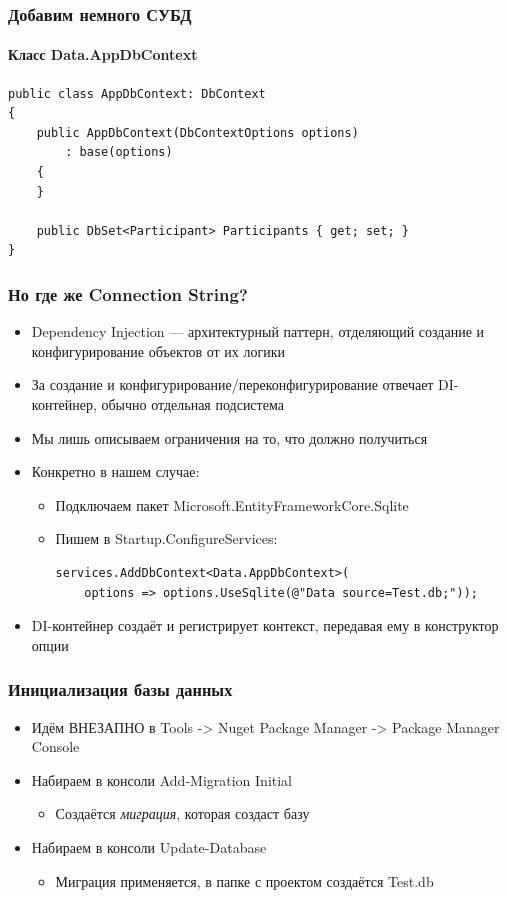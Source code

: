 \documentclass[xetex,mathserif,serif]{beamer}
\begin{document}
	\begin{frame}[fragile]
		\frametitle{Добавим немного СУБД}
		\framesubtitle{Класс Data.AppDbContext}
		\begin{small}
			\begin{verbatim}
public class AppDbContext: DbContext
{
    public AppDbContext(DbContextOptions options)
        : base(options)
    {
    }

    public DbSet<Participant> Participants { get; set; }
}
			\end{verbatim}
		\end{small}
	\end{frame}

	\begin{frame}[fragile]
		\frametitle{Но где же Connection String?}
		\begin{itemize}
			\item Dependency Injection --- архитектурный паттерн, отделяющий создание и конфигурирование объектов от их логики
			\item За создание и конфигурирование/переконфигурирование отвечает DI-контейнер, обычно отдельная подсистема
			\item Мы лишь описываем ограничения на то, что должно получиться
			\item Конкретно в нашем случае:
			\begin{itemize} 
				\item Подключаем пакет Microsoft.EntityFrameworkCore.Sqlite
				\item Пишем в Startup.ConfigureServices:
				\begin{verbatim}
services.AddDbContext<Data.AppDbContext>(
    options => options.UseSqlite(@"Data source=Test.db;"));
				\end{verbatim}
			\end{itemize}
			\item DI-контейнер создаёт и регистрирует контекст, передавая ему в конструктор опции
		\end{itemize}
	\end{frame}

	\begin{frame}
		\frametitle{Инициализация базы данных}
		\begin{itemize}
			\item Идём ВНЕЗАПНО в Tools -> Nuget Package Manager -> Package Manager Console
			\item Набираем в консоли Add-Migration Initial
			\begin{itemize}
				\item Создаётся \textit{миграция}, которая создаст базу
			\end{itemize}
			\item Набираем в консоли Update-Database
			\begin{itemize}
				\item Миграция применяется, в папке с проектом создаётся Test.db
			\end{itemize}
		\end{itemize}
	\end{frame}
\end{document}
